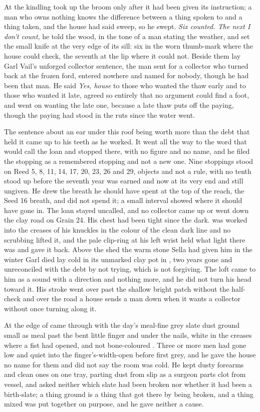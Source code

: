 At the kindling  took up the broom only after it had been given its instruction; a man who owns nothing knows the difference between a thing spoken to and a thing taken, and the house had said sweep, so he swept. \emph{Six counted. The next I don't count}, he told the wood, in the tone of a man stating the weather, and set the small knife at the very edge of its sill: six in the worn thumb-mark where the house could check, the seventh at the lip where it could not. Beside them lay Garl Vail's unforged collector sentence, the man sent for a collector who turned back at the frozen ford, entered nowhere and named for nobody, though he had been that man. He said \emph{Yes, house} to those who wanted the thaw early and to those who wanted it late, agreed so entirely that no argument could find a foot, and went on wanting the late one, because a late thaw puts off the paying, though the paying had stood in the ruts since the water went.

The sentence about an ear under this roof being worth more than the debt that held it came up to his teeth as he worked. It went all the way to the word that would call the loan and stopped there, with no figure and no name, and he filed the stopping as a remembered stopping and not a new one. Nine stoppings stood on Reed 5, 8, 11, 14, 17, 20, 23, 26 and 29, objects and not a rule, with no tenth stood up before the seventh year was earned and now at its very end and still ungiven. He drew the breath he should have spent at the top of the reach, the Seed 16 breath, and did not spend it; a small interval showed where it should have gone in. The loan stayed uncalled, and no collector came up or went down the clay road on Grain 24. His chest had been tight since the dark.  was worked into the creases of his knuckles in the colour of the clean dark line and no scrubbing lifted it, and the pale clip-ring at his left wrist held what light there was and gave it back. Above the shed the warm stone Sella had given him in the winter Garl died lay cold in its unmarked clay pot in , two years gone and unreconciled with the debt by not trying, which is not forgiving. The loft came to him as a sound with a direction and nothing more, and he did not turn his head toward it. His stroke went over  past the shallow bright patch without the half-check and over the road a house sends a man down when it wants a collector without once turning along it.

At the edge of   came through with the day's meal-fine grey slate dust ground small as meal past the bent little finger and under the nails, white in the creases where a fist had opened, and not bone-coloured . Three or more men had gone low and quiet into the finger's-width-open  before first grey, and he gave the house no name for them and did not say the room was cold. He kept dusty forearms and clean ones on one tray, parting dust from slip as a surgeon parts clot from vessel, and asked neither which slate had been broken nor whether it had been a birth-slate; a thing ground is a thing that got there by being broken, and a thing mixed was put together on purpose, and he gave neither a cause.

